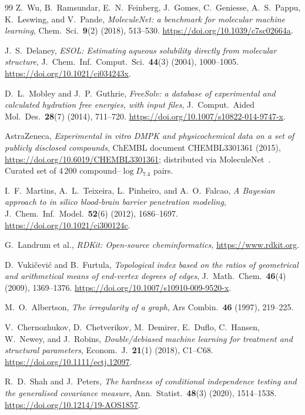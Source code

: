 \documentclass[11pt,a4paper]{article}
\theoremstyle{definition}
\begin{document}
\begin{thebibliography}{99}
Z.~Wu, B.~Ramsundar, E.~N.~Feinberg, J.~Gomes, C.~Geniesse,
A.~S.~Pappu, K.~Leswing, and V.~Pande,
\emph{MoleculeNet: a benchmark for molecular machine learning},
Chem.~Sci.~\textbf{9}(2) (2018), 513--530.
\url{https://doi.org/10.1039/c7sc02664a}.

J.~S.~Delaney,
\emph{ESOL: Estimating aqueous solubility directly from molecular structure},
J.~Chem.~Inf.~Comput.~Sci.~\textbf{44}(3) (2004), 1000--1005.
\url{https://doi.org/10.1021/ci034243x}.

D.~L.~Mobley and J.~P.~Guthrie,
\emph{FreeSolv: a database of experimental and calculated hydration free energies, with input files},
J.~Comput.~Aided Mol.~Des.~\textbf{28}(7) (2014), 711--720.
\url{https://doi.org/10.1007/s10822-014-9747-x}.

AstraZeneca, \emph{Experimental in vitro DMPK and physicochemical data
on a set of publicly disclosed compounds},
ChEMBL document CHEMBL3301361 (2015), \url{https://doi.org/10.6019/CHEMBL3301361};
distributed via MoleculeNet~\cite{MoleculeNet}. Curated set of
4\,200 compound--$\log D_{7.4}$ pairs.

I.~F.~Martins, A.~L.~Teixeira, L.~Pinheiro, and A.~O.~Falcao,
\emph{A Bayesian approach to in silico blood-brain barrier penetration modeling},
J.~Chem.~Inf.~Model.~\textbf{52}(6) (2012), 1686--1697.
\url{https://doi.org/10.1021/ci300124c}.

G.~Landrum et al.,
\emph{RDKit: Open-source cheminformatics},
\url{https://www.rdkit.org}.

D.~Vuki\v{c}evi\'c and B.~Furtula,
\emph{Topological index based on the ratios of geometrical
and arithmetical means of end-vertex degrees of edges},
J.~Math.~Chem.~\textbf{46}(4) (2009), 1369--1376.
\url{https://doi.org/10.1007/s10910-009-9520-x}.

M.~O.~Albertson,
\emph{The irregularity of a graph},
Ars Combin.~\textbf{46} (1997), 219--225.

V.~Chernozhukov, D.~Chetverikov, M.~Demirer, E.~Duflo, C.~Hansen, W.~Newey, and J.~Robins,
\emph{Double/debiased machine learning for treatment and structural parameters},
Econom.~J.~\textbf{21}(1) (2018), C1--C68.
\url{https://doi.org/10.1111/ectj.12097}.

R.~D.~Shah and J.~Peters,
\emph{The hardness of conditional independence testing and the generalised covariance measure},
Ann.~Statist.~\textbf{48}(3) (2020), 1514--1538.
\url{https://doi.org/10.1214/19-AOS1857}.


\end{thebibliography}
\end{document}
